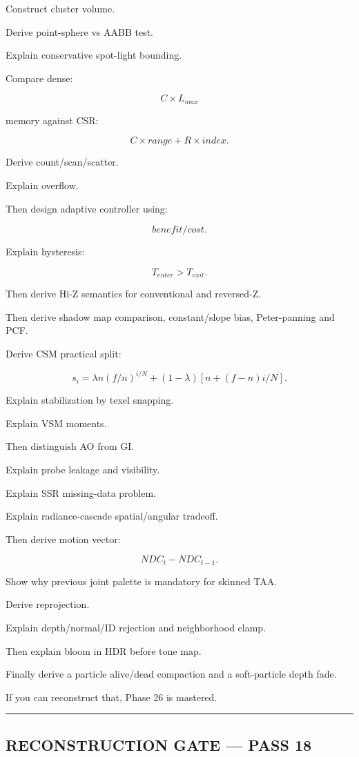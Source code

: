 Construct cluster volume.

Derive point-sphere vs AABB test.

Explain conservative spot-light bounding.

Compare dense:

\[
C\times L_{max}
\]

memory against CSR:

\[
C\times range+
R\times index.
\]

Derive count/scan/scatter.

Explain overflow.

Then design adaptive controller using:

\[
benefit/cost.
\]

Explain hysteresis:

\[
T_{enter}>T_{exit}.
\]

Then derive Hi-Z semantics for conventional and reversed-Z.

Then derive shadow map comparison, constant/slope bias, Peter-panning and PCF.

Derive CSM practical split:

\[
s_i=
\lambda
n(f/n)^{i/N}
+
(1-\lambda)
[n+(f-n)i/N].
\]

Explain stabilization by texel snapping.

Explain VSM moments.

Then distinguish AO from GI.

Explain probe leakage and visibility.

Explain SSR missing-data problem.

Explain radiance-cascade spatial/angular tradeoff.

Then derive motion vector:

\[
NDC_t-NDC_{t-1}.
\]

Show why previous joint palette is mandatory for skinned TAA.

Derive reprojection.

Explain depth/normal/ID rejection and neighborhood clamp.

Then explain bloom in HDR before tone map.

Finally derive a particle alive/dead compaction and a soft-particle depth fade.

If you can reconstruct that, Phase 26 is mastered.

\begin{center}\rule{0.5\linewidth}{0.5pt}\end{center}

\subsection{RECONSTRUCTION GATE --- PASS 18}\label{04-visual-computing-ii-ch041-reconstruction-gate-pass-18}

